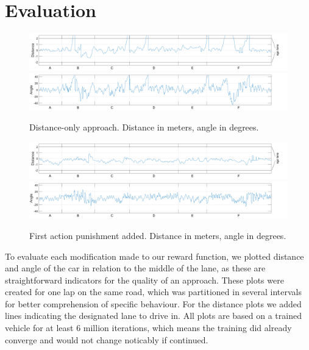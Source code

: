 
\section{Evaluation}\label{sec:evaluation}
\begin{figure}[!t]
\centering
\includegraphics[scale=0.265]{../plots/dist_eval_log_distance_serpentine_06speed}
\vspace{0.5em}
\includegraphics[scale=0.265]{../plots/ang_eval_log_distance_serpentine_06speed}
\vspace{-2.25em}
\caption{Distance-only approach. Distance in meters, angle in degrees.}
\label{distance06}
\vspace{1em}
\includegraphics[scale=0.265]{../plots/dist_eval_log_dumb_actions_serpentine_06speed}
\vspace{0.5em}
\includegraphics[scale=0.265]{../plots/ang_eval_log_dumb_actions_serpentine_06speed}
\vspace{-2.25em}\label{fig_first_case}
\caption{First action punishment added. Distance in meters, angle in degrees.}
\label{dumbactions06}
\end{figure}

To evaluate each modification made to our reward function, we plotted distance and angle of the car in relation to the middle of the lane, as these are straightforward indicators for the quality of an approach. These plots were created for one lap on the same road, which was partitioned in several intervals for better comprehension of specific behaviour. For the distance plots we added lines indicating the designated lane to drive in. All plots are based on a trained vehicle for at least 6 million iterations, which means the training did already converge and would not change noticably if continued. 

